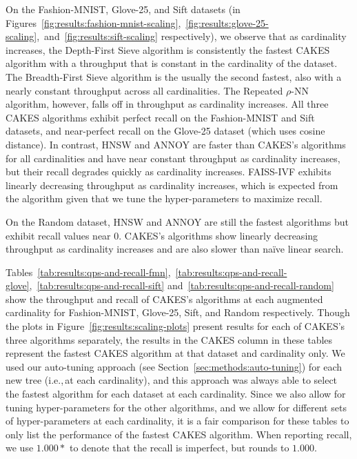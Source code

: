 On the Fashion-MNIST, Glove-25, and Sift datasets (in Figures~\ref{fig:results:fashion-mnist-scaling},~\ref{fig:results:glove-25-scaling},~and~\ref{fig:results:sift-scaling} respectively), we observe that as cardinality increases, the Depth-First Sieve algorithm is consistently the fastest CAKES algorithm with a throughput that is constant in the cardinality of the dataset.
The Breadth-First Sieve algorithm is the usually the second fastest, also with a nearly constant throughput across all cardinalities.
The Repeated $\rho$-NN algorithm, however, falls off in throughput as cardinality increases.
All three CAKES algorithms exhibit perfect recall on the Fashion-MNIST and Sift datasets, and near-perfect recall on the Glove-25 dataset (which uses cosine distance).
In contrast, HNSW and ANNOY are faster than CAKES's algorithms for all cardinalities and have near constant throughput as cardinality increases, but their recall degrades quickly as cardinality increases.
FAISS-IVF exhibits linearly decreasing throughput as cardinality increases, which is expected from the algorithm given that we tune the hyper-parameters to maximize recall.

On the Random dataset, HNSW and ANNOY are still the fastest algorithms but exhibit recall values near 0.
CAKES's algorithms show linearly decreasing throughput as cardinality increases and are also slower than na\"{i}ve linear search.

Tables~\ref{tab:results:qps-and-recall-fmn},~\ref{tab:results:qps-and-recall-glove},~\ref{tab:results:qps-and-recall-sift} and~\ref{tab:results:qps-and-recall-random} show the throughput and recall of CAKES's algorithms at each augmented cardinality for Fashion-MNIST, Glove-25, Sift, and Random respectively.
Though the plots in Figure~\ref{fig:results:scaling-plots} present results for each of CAKES's three algorithms separately, the results in the CAKES column in these tables represent the fastest CAKES algorithm at that dataset and cardinality only.
We used our auto-tuning approach (see Section~\ref{sec:methods:auto-tuning}) for each new tree (i.e.,\,at each cardinality), and this approach was always able to select the fastest algorithm for each dataset at each cardinality.
Since we also allow for tuning hyper-parameters for the other algorithms, and we allow for different sets of hyper-parameters at each cardinality, it is a fair comparison for these tables to only list the performance of the fastest CAKES algorithm.
When reporting recall, we use $1.000*$ to denote that the recall is imperfect, but rounds to $1.000$.

